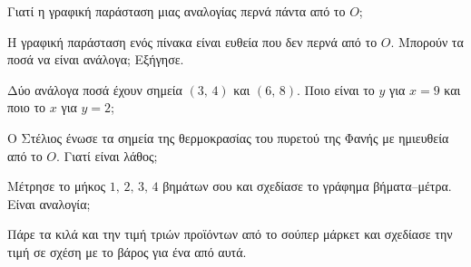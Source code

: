 
\ex Γιατί η γραφική παράσταση μιας αναλογίας περνά πάντα από το $O$;

\ex Η γραφική παράσταση ενός πίνακα είναι ευθεία που δεν περνά από το $O$. Μπορούν τα ποσά να είναι ανάλογα; Εξήγησε.

\ex Δύο ανάλογα ποσά έχουν σημεία $(3,\,4)$ και $(6,\,8)$. Ποιο είναι το $y$ για $x=9$ και ποιο το $x$ για $y=2$;

\ex Ο Στέλιος ένωσε τα σημεία της θερμοκρασίας του πυρετού της Φανής με ημιευθεία από το $O$. Γιατί είναι λάθος;


\ex Μέτρησε το μήκος $1,\,2,\,3,\,4$ βημάτων σου και σχεδίασε το γράφημα βήματα--μέτρα. Είναι αναλογία;

\ex Πάρε τα κιλά και την τιμή τριών προϊόντων από το σούπερ μάρκετ και σχεδίασε την τιμή σε σχέση με το βάρος για ένα από αυτά.
